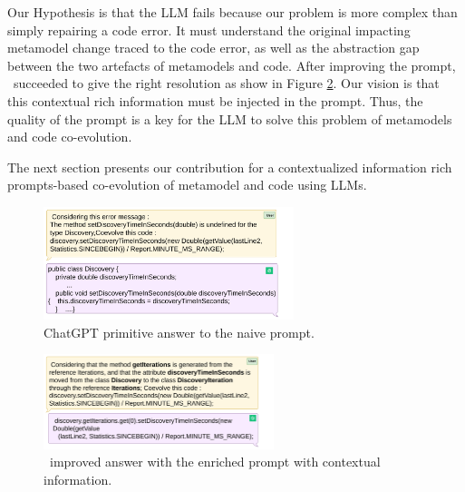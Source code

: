 Our Hypothesis is that the LLM fails because our problem is more complex than simply repairing a code error. It must understand the original impacting metamodel change traced to the code error, as well as the abstraction gap between the two artefacts of metamodels and code. After improving the prompt, \LLM~succeeded to give the right resolution as show in Figure \ref{fig: chatgptimprovedanswer}.
Our vision is that this contextual rich information must be injected in the prompt.
Thus, the quality of the prompt is a key for the LLM to solve this problem of metamodels and code co-evolution. %

%
The next section presents our contribution for a contextualized information rich prompts-based co-evolution of metamodel and code using LLMs.  


\begin{figure}[t]
	\centering
	\includegraphics[width=0.65\textwidth]{./pics/chapter3pics/chatgptprimitiveanswer.png}
	\caption{ChatGPT primitive answer to the naive prompt.}
	\label{fig: chatgptanswer}
\end{figure}

\begin{figure}[t]
	\centering
	\includegraphics[width=0.6\textwidth]{./pics/chapter3pics/chatgptimprivedanswer.png}
	\caption{\LLM~improved answer with the enriched prompt with contextual information.}
	\label{fig: chatgptimprovedanswer}
	\vspace{-5mm}
\end{figure}
